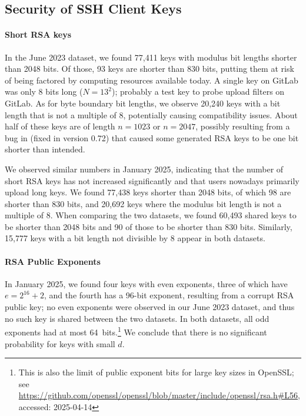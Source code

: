 \subsection{Security of SSH Client Keys}
\label{subsec:security2}

\paragraph{Short RSA keys}

In the June 2023 dataset, we found 77,411 keys with modulus bit lengths shorter than 2048 bits. Of those, 93 keys are shorter than 830 bits, putting them at risk of being factored by computing resources available today. A single key on GitLab was only 8 bits long ($N = 13^2$); probably a test key to probe upload filters on GitLab. As for byte boundary bit lengths, we observe 20,240 keys with a bit length that is not a multiple of 8, potentially causing compatibility issues. About half of these keys are of length $n = 1023$ or $n = 2047$, possibly resulting from a bug in \putty (fixed in version 0.72) that caused some generated RSA keys to be one bit shorter than intended.

We observed similar numbers in January 2025, indicating that the number of short RSA keys has not increased significantly and that users nowadays primarily upload long keys. We found 77,438 keys shorter than 2048 bits, of which 98 are shorter than 830 bits, and 20,692 keys where the modulus bit length is not a multiple of 8. When comparing the two datasets, we found 60,493 shared keys to be shorter than 2048 bits and 90 of those to be shorter than 830 bits. Similarly, 15,777 keys with a bit length not divisible by 8 appear in both datasets.

\paragraph{RSA Public Exponents}

In January 2025, we found four keys with even exponents, three of which have $e = 2^{16} + 2$, and the fourth has a 96-bit exponent, resulting from a corrupt RSA public key; no even exponents were observed in our June 2023 dataset, and thus no such key is shared between the two datasets. In both datasets, all odd exponents had at most 64~bits.\footnote{This is also the limit of public exponent bits for large key sizes in OpenSSL; see \url{https://github.com/openssl/openssl/blob/master/include/openssl/rsa.h\#L56}, accessed: 2025-04-14} We conclude that there is no significant probability for keys with small $d$.

